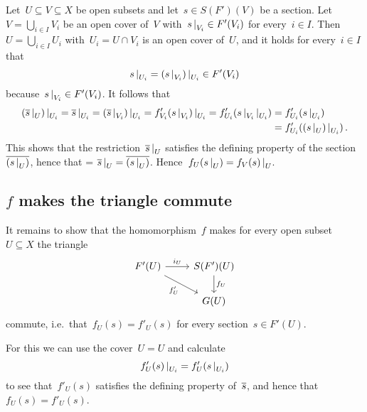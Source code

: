 Let~$U \subseteq V \subseteq X$ be open subsets and let~$s \in S(F')(V)$ be a section.
Let~$V = \bigcup_{i \in I} V_i$ be an open cover of~$V$ with~$\restrict{s}{V_i} \in F'(V_i)$ for every~$i \in I$.
Then~$U = \bigcup_{i \in I} U_i$ with~$U_i = U \cap V_i$ is an open cover of~$U$, and it holds for every~$i \in I$ that
\[
      \restrict{s}{U_i}
  =   \restrict{(\restrict{s}{V_i})}{U_i}
  \in F'(V_i)
\]
because~$\restrict{s}{V_i} \in F'(V_i)$.
It follows that
\begin{align*}
      \restrict{ (\restrict{\induced{s}}{U}) }{U_i}
   =  \restrict{ \induced{s} }{U_i}
   =  \restrict{ (\restrict{\induced{s}}{V_i}) }{U_i}
   =  \restrict{f'_{V_i}(\restrict{s}{V_i})}{U_i}
   =  f'_{U_i}( \restrict{ \restrict{s}{V_i} }{U_i} )
  &=  f'_{U_i}( \restrict{s}{U_i} ) \\
  &=  f'_{U_i}( \restrict{ (\restrict{s}{U}) }{ U_i} ) \,.
\end{align*}
This shows that the restriction~$\restrict{\induced{s}}{U}$ satisfies the defining property of the section~$\induced{(\restrict{s}{U})}$, hence that = $\restrict{\induced{s}}{U} = \induced{(\restrict{s}{U})}$.
Hence~$f_U(\restrict{s}{U}) = \restrict{ f_V(s) }{U}$.



\subsection{$f$ makes the triangle commute}

It remains to show that the homomorphism~$f$ makes for every open subset~$U \subseteq X$ the triangle
\[
  \begin{tikzcd}
      F'(U)
      \arrow{r}[above]{i_U}
      \arrow{dr}[below left]{f'_U}
    & S(F')(U)
      \arrow{d}[right]{f_U}
    \\
    {}
    & G(U)
  \end{tikzcd}
\]
commute, i.e.\ that~$f_U(s) = f'_U(s)$ for every section~$s \in F'(U)$.

For this we can use the cover~$U = U$ and calculate
\[
    \restrict{f'_U(s)}{U_i}
  = f'_U( \restrict{s}{U_i} )
\]
to see that~$f'_U(s)$ satisfies the defining property of~$\overline{s}$, and hence that~$f_U(s) = f'_U(s)$.









